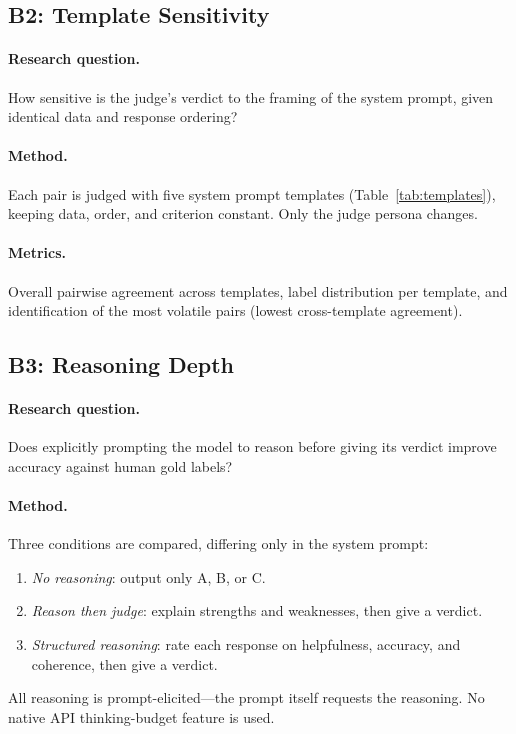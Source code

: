 \documentclass[11pt,a4paper]{article}
\begin{document}
\subsection{B2: Template Sensitivity}\label{sec:b2}

\paragraph{Research question.}
How sensitive is the judge's verdict to the framing of the system prompt,
given identical data and response ordering?

\paragraph{Method.}
Each pair is judged with five system prompt templates (Table~\ref{tab:templates}),
keeping data, order, and criterion constant. Only the judge persona changes.

\paragraph{Metrics.}
Overall pairwise agreement across templates, label distribution per template,
and identification of the most volatile pairs (lowest cross-template agreement).


\subsection{B3: Reasoning Depth}\label{sec:b3}

\paragraph{Research question.}
Does explicitly prompting the model to reason before giving its verdict improve
accuracy against human gold labels?

\paragraph{Method.}
Three conditions are compared, differing only in the system prompt:
\begin{enumerate}[nosep]
  \item \textit{No reasoning}: output only A, B, or C.
  \item \textit{Reason then judge}: explain strengths and weaknesses, then
        give a verdict.
  \item \textit{Structured reasoning}: rate each response on helpfulness,
        accuracy, and coherence, then give a verdict.
\end{enumerate}
All reasoning is prompt-elicited---the prompt itself requests the reasoning.
No native API thinking-budget feature is used.
\end{document}
